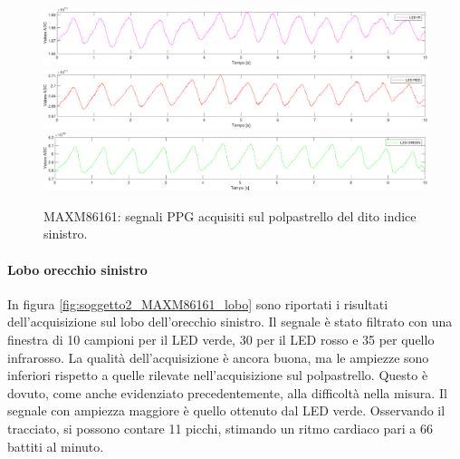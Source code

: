 \begin{figure}[h]
	\centering
	\includegraphics[width=1\linewidth]{ImageFiles/Misure Preliminari/Soggetto 2/maxm86161/polpastrello_ir_moving_avg}
	\includegraphics[width=1\linewidth]{ImageFiles/Misure Preliminari/Soggetto 2/maxm86161/polpastrello_red_moving_avg}
	\includegraphics[width=1\linewidth]{ImageFiles/Misure Preliminari/Soggetto 2/maxm86161/polpastrello_green_moving_avg}
	\caption{MAXM86161: segnali PPG acquisiti sul polpastrello del dito indice sinistro.}
	\label{fig:soggetto2_MAXM86161_polpastrello}
\end{figure}

\clearpage

\paragraph{Lobo orecchio sinistro}
In figura \ref{fig:soggetto2_MAXM86161_lobo} sono riportati i risultati dell'acquisizione sul lobo dell'orecchio sinistro. Il segnale è stato filtrato con una finestra di 10 campioni per il LED verde, 30 per il LED rosso e 35 per quello infrarosso. La qualità dell'acquisizione è ancora buona, ma le ampiezze sono inferiori rispetto a quelle rilevate nell'acquisizione sul polpastrello. Questo è dovuto, come anche evidenziato precedentemente, alla difficoltà nella misura. Il segnale con ampiezza maggiore è quello ottenuto dal LED verde. Osservando il tracciato, si possono contare 11 picchi, stimando un ritmo cardiaco pari a 66 battiti al minuto.

